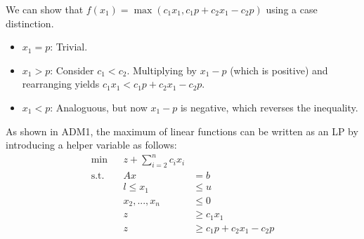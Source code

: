 \begin{aufgabe}
	We can show that $f(x_1) = \max(c_1x_1, c_1p + c_2x_1 - c_2p)$ using a case distinction.
	\begin{itemize}
		\item $x_1 = p$: Trivial.
		\item $x_1 > p$: Consider $c_1 < c_2$. Multiplying by $x_1 - p$ (which is positive)
		      and rearranging yields $c_1x_1 < c_1p + c_2x_1 - c_2p$.
		\item $x_1 < p$: Analoguous, but now $x_1 - p$ is negative, which reverses the inequality.
	\end{itemize}
	As shown in ADM1, the maximum of linear functions can be written as an LP by introducing a helper variable as follows:
	\begin{align*}
		\min         &  & z + \sum_{i=2}^n c_ix_i                             \\
		\text{s.t. } &  & Ax                      & = b                       \\
		             &  & l \leq x_1              & \leq u                    \\
		             &  & x_2,...,x_n             & \leq 0                    \\
		             &  & z                       & \geq c_1x_1               \\
		             &  & z                       & \geq c_1p + c_2x_1 - c_2p
	\end{align*}
\end{aufgabe}
